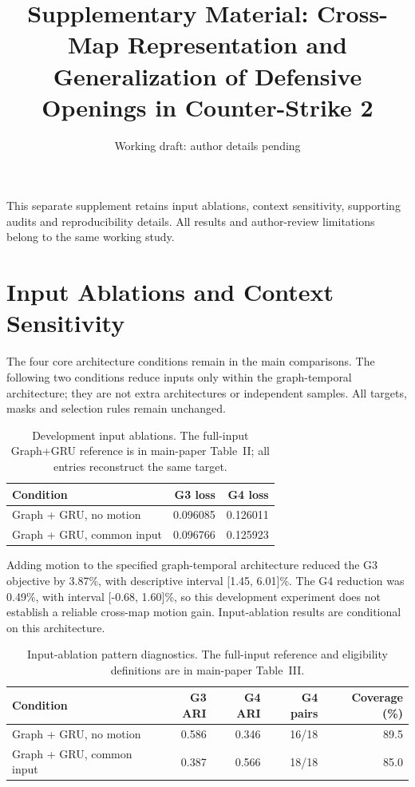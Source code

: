
\title{Supplementary Material: Cross-Map Representation and Generalization of Defensive Openings in Counter-Strike 2}
\author{Working draft: author details pending}
\renewcommand{\thetable}{S\arabic{table}}
\renewcommand{\thefigure}{S\arabic{figure}}

\maketitle
\noindent This separate supplement retains input ablations, context sensitivity, supporting audits and reproducibility details. All results and author-review limitations belong to the same working study.
\appendices

\section{Input Ablations and Context Sensitivity}
\label{app:ablations}
The four core architecture conditions remain in the main comparisons. The following two conditions reduce inputs only within the graph-temporal architecture; they are not extra architectures or independent samples. All targets, masks and selection rules remain unchanged.

\begin{table}[!h]
\caption{Development input ablations. The full-input Graph+GRU reference is in main-paper Table~II; all entries reconstruct the same target.}
\label{tab:inputablation}
\centering\small
\begin{tabular}{lrr}
\toprule
Condition & G3 loss & G4 loss\\
\midrule
Graph + GRU, no motion & 0.096085 & 0.126011 \\ %
Graph + GRU, common input & 0.096766 & 0.125923 \\ %
\bottomrule
\end{tabular}
\end{table}

Adding motion to the specified graph-temporal architecture reduced the G3 objective by 3.87\%, with descriptive interval [1.45, 6.01]\%. The G4 reduction was 0.49\%, with interval [-0.68, 1.60]\%, so this development experiment does not establish a reliable cross-map motion gain. Input-ablation results are conditional on this architecture. %

\begin{table}[t]
\caption{Input-ablation pattern diagnostics. The full-input reference and eligibility definitions are in main-paper Table~III.}
\label{tab:patternablation}
\centering\small
\begin{tabular}{lrrrr}
\toprule
Condition & G3 ARI & G4 ARI & G4 pairs & Coverage (\%)\\
\midrule
Graph + GRU, no motion & 0.586 & 0.346 & 16/18 & 89.5 \\ %
Graph + GRU, common input & 0.387 & 0.566 & 18/18 & 85.0 \\ %
\bottomrule
\end{tabular}
\end{table}

